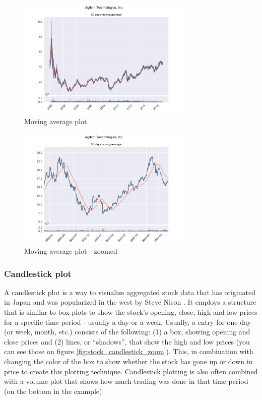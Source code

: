 \documentclass[12pt, a4paper]{article}
\begin{document}
\begin{figure}[H]
    \centering
    \includegraphics[width=0.75\textwidth]{src/stocks/simple/movingavg}
    \caption{Moving average plot}
    \label{fig:stock_movingavg}
\end{figure}

\begin{figure}[H]
    \centering
    \includegraphics[width=0.75\textwidth]{src/stocks/simple/movingavg_zoom}
    \caption{Moving average plot - zoomed}
    \label{fig:stock_movingavg_zoom}
\end{figure}

\subsubsection{Candlestick plot}

A candlestick plot is a way to visualize aggregated stock data that has originated in Japan and was popularized in the west by Steve Nison \cite{candlestick}. It employs a structure that is similar to box plots to show the stock’s opening, close, high and low prices for a specific time period - usually a day or a week. Usually, a entry for one day (or week, month, etc.) consists of the following: (1) a box, showing opening and close prices and (2) lines, or “shadows”, that show the high and low prices (you can see those on figure \ref{fig:stock_candlestick_zoom}). This, in combination with changing the color of the box to show whether the stock has gone up or down in price to create this plotting technique. Candlestick plotting is also often combined with a volume plot that shows how much trading was done in that time period (on the bottom in the example).
\end{document}
